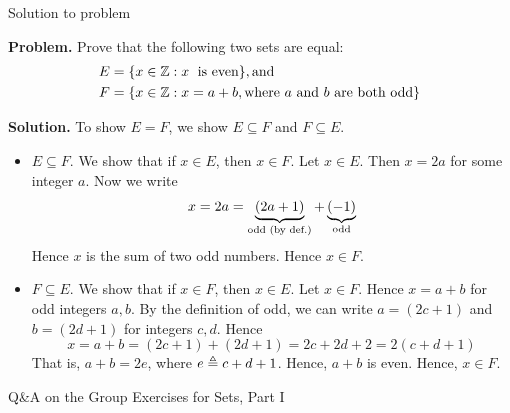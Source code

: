 \documentclass[10pt]{beamer}
\begin{document}
\begin{frame}{Solution to problem}


\textbf{Problem.} 
Prove that the following two sets are equal:
%
\begin{align*}
E &= \set{x \in \mathbb{Z}: x \text{\; is even}}, \text{and} \\
F &= \set{x \in \mathbb{Z}: x=a+b, \text{where $a$ and $b$ are both odd}}
\end{align*}


\vfill 
\textbf{Solution.} To show $E=F$, we show $E \subseteq F$ and $F \subseteq E$.
\begin{itemize}
\item $\boxed{E \subseteq F.}$ We show that if $x \in E $, then $x \in F$.  Let $x \in E$.  Then $x=2a$ for some integer $a$.  Now we write	
\[ x=2a = \explaintermbrace{odd (by def.)}{(2a+1)} + \explaintermbrace{odd}{(-1)}\]  Hence $x$ is the sum of two odd numbers.  Hence  $x \in F$.
\item $\boxed{F \subseteq E.}$	We show that if $x \in F$, then $x \in E$. Let $x \in F$.  Hence $x=a+b$ for odd integers $a,b$.  By the definition of odd, we can write $a=(2c+1)$ and $b=(2d+1)$ for integers $c,d$.  Hence
\[x= a+b = (2c+1) + (2d+1) = 2c+2d+2 = 2 (c+d+1) \] 
That is, $a+b=2e$, where $e \defeq c+d+1$.  Hence, $a+b$ is even. Hence, $x \in F$.
\end{itemize}

\end{frame}


\begin{frame}[standout]
Q\&A on the Group Exercises for Sets, Part I 
\end{frame}
\end{document}
